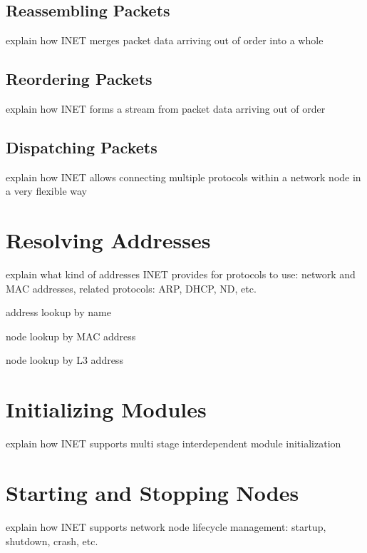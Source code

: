 \subsection{Reassembling Packets}

explain how INET merges packet data arriving out of order into a whole


\subsection{Reordering Packets}

explain how INET forms a stream from packet data arriving out of order


\subsection{Dispatching Packets}

explain how INET allows connecting multiple protocols within a network node in a very flexible way



\section{Resolving Addresses}

explain what kind of addresses INET provides for protocols to use: network
and MAC addresses, related protocols: ARP, DHCP, ND, etc.

address lookup by name

node lookup by MAC address

node lookup by L3 address


\section{Initializing Modules}

explain how INET supports multi stage interdependent module initialization



\section{Starting and Stopping Nodes}

explain how INET supports network node lifecycle management: startup, shutdown, crash, etc.



